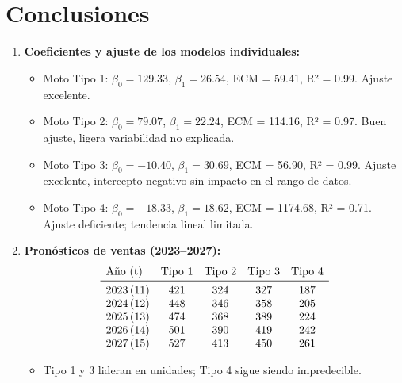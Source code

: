 \documentclass[12pt,a4paper]{article}
\begin{document}
\section{Conclusiones}
\begin{enumerate}\small
    \item \textbf{Coeficientes y ajuste de los modelos individuales:}
    \begin{itemize}
        \item Moto Tipo 1: $\beta_0 = 129.33$, $\beta_1 = 26.54$, ECM = 59.41, R² = 0.99. Ajuste excelente.
        \item Moto Tipo 2: $\beta_0 = 79.07$, $\beta_1 = 22.24$, ECM = 114.16, R² = 0.97. Buen ajuste, ligera variabilidad no explicada.
        \item Moto Tipo 3: $\beta_0 = -10.40$, $\beta_1 = 30.69$, ECM = 56.90, R² = 0.99. Ajuste excelente, intercepto negativo sin impacto en el rango de datos.
        \item Moto Tipo 4: $\beta_0 = -18.33$, $\beta_1 = 18.62$, ECM = 1174.68, R² = 0.71. Ajuste deficiente; tendencia lineal limitada.
    \end{itemize}

    \item \textbf{Pronósticos de ventas (2023–2027):}
    \[
    \begin{array}{lcccc}
    \text{Año (t)} & \text{Tipo 1} & \text{Tipo 2} & \text{Tipo 3} & \text{Tipo 4} \\ \midrule
    2023\,(11) & 421 & 324 & 327 & 187 \\
    2024\,(12) & 448 & 346 & 358 & 205 \\
    2025\,(13) & 474 & 368 & 389 & 224 \\
    2026\,(14) & 501 & 390 & 419 & 242 \\
    2027\,(15) & 527 & 413 & 450 & 261 \\
    \end{array}
    \]
    \begin{itemize}
        \item Tipo 1 y 3 lideran en unidades; Tipo 4 sigue siendo impredecible.
    \end{itemize}


\end{enumerate}
\end{document}
